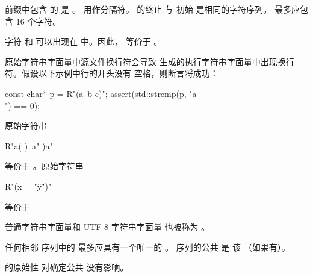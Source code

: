 \pnum
{}%
前缀中包含  的 
%
是 。
 用作分隔符。
 的终止  与
初始  是相同的字符序列。
最多应包含 16 个字符。

\pnum
\begin{note}
字符  和  可以出现在
 中。因此， 等价于
。
\end{note}

\pnum
\begin{note}
原始字符串字面量中源文件换行符会导致
生成的执行字符串字面量中出现换行符。假设以下示例中行的开头没有
空格，则断言将成功：
\begin{codeblock}
const char* p = R"(a\
b
c)";
assert(std::strcmp(p, "a\\\nb\nc") == 0);
\end{codeblock}
\end{note}

\pnum
\begin{example}
原始字符串
\begin{codeblock}
R"a(
)\
a"
)a"
\end{codeblock}
等价于 。原始字符串
\begin{codeblock}
R"(x = "\"y\"")"
\end{codeblock}
等价于 .
\end{example}

\pnum
{}%
普通字符串字面量和 UTF-8 字符串字面量
也被称为 。

\pnum
{}%
任何相邻  序列中的 
最多应具有一个唯一的 。
序列的公共 \grammarterm{encoding-prefix} 是
该 \grammarterm{encoding-prefix}（如果有）。
\begin{note}
 的原始性
对确定公共  没有影响。
\end{note}


